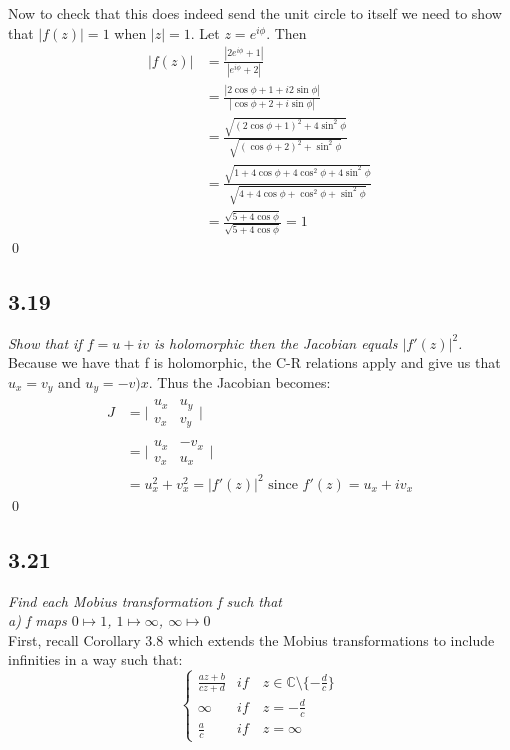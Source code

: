 \documentclass[a4paper, 11pt]{article}
\begin{document}
	\noindent Now to check that this does indeed send the unit circle to itself we need to show that $|f(z)|=1$ when $|z|=1$. Let $z=e^{i\phi}$. Then 
		\begin{align*}
			|f(z)| &= \frac{|2e^{i\phi}+1|}{|e^{i\phi}+2|} \\ 
				&= \frac{|2\cos\phi+1 + i2\sin\phi|}{|\cos\phi+2+i\sin\phi|} \\ 
				&= \frac{\sqrt{(2\cos\phi+1)^2+4\sin^2\phi}}{\sqrt{(\cos\phi+2)^2+\sin^2\phi}}\\
				&=\frac{\sqrt{1+4\cos\phi+4\cos^2\phi+4\sin^2\phi}}{\sqrt{4+4\cos\phi+\cos^2\phi+\sin^2\phi}}\\ 
				&=\frac{\sqrt{5+4\cos\phi}}{\sqrt{5+4\cos\phi}} = 1 
		\end{align*} \qed
		
		
\subsection*{3.19} 
	\textit{Show that if $f=u+iv$ is holomorphic then the Jacobian equals $|f'(z)|^2$.}\\
	
	\noindent Because we have that f is holomorphic, the C-R relations apply and give us that $u_x=v_y$ and $u_y=-v)x$. Thus the Jacobian becomes: 
		\begin{align*}
			J & = \Big|\begin{matrix}
				u_x & u_y \\ 
				v_x & v_y
			\end{matrix}\Big| \\ 
			&= \Big|\begin{matrix}
				u_x & -v_x \\ 
				v_x & u_x 
			\end{matrix}\Big| \\ 	
			&= u_x^2 + v_x^2 = |f'(z)|^2 \text{ since } f'(z) = u_x+iv_x 
		\end{align*} \qed 
		
\subsection*{3.21}
	\textit{Find each Mobius transformation f such that}\\ 
	
	\noindent \textit{a) f maps $0\mapsto1$, $1\mapsto \infty$, $\infty \mapsto 0$}\\
	
	\noindent First, recall Corollary 3.8 which extends the Mobius transformations to include infinities in a way such that: 
		\begin{equation*}
			\begin{cases}
				\frac{az+b}{cz+d} & if \quad z \in \mathbb{C}\setminus\{-\frac{d}{c}\} \\ 
				\infty & if \quad z = -\frac{d}{c} \\ 
				\frac{a}{c} & if \quad z =\infty 
			\end{cases}
		\end{equation*}
	
\end{document}
